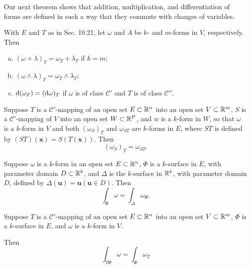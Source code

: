Our next theorem shows that addition, multiplication, and differentiation
of forms are defined in such a way that they commute with changes of variables.

\begin{thm}
    \label{thm:10.22}
    With $E$ and $T$ as in Sec. 10.21, let $\omega$ and $A$ be $k$- and $m$-forms in $V$, respectively. Then
    \begin{enumerate}[(a)]
        \item $(\omega + \lambda)_T = \omega_T + \lambda_T$ if $k = m$;
        \item $(\omega \wedge \lambda)_T = \omega_T \wedge \lambda_T$;
        \item $\d (\omega_T) = (\d \omega)_T$
              if $\omega$ is of class $\mathscr{C}'$
              and $T$ is of class $\mathscr{C}''$.
    \end{enumerate}
\end{thm}


\begin{thm}
    \label{thm:10.23}
    Suppose $T$ is a $\mathscr{C}'$-mapping of an open set $E \subset {\protect\mathbb R}^n$ into an open set $V \subset {\protect\mathbb R}^m$,
    $S$ is a $\mathscr{C}'$-mapping of $V$ into an open set $W \subset {\protect\mathbb R}^P$, and $w$ is a $k$-form in $W$,
    so that $\omega$ is a $k$-form in $V$
    and both $(\omega_S)_T$ and $\omega_{ST}$ are $k$-forms in $E$,
    where $ST$ is defined by $(ST)(\mathbf{x}) = S(T(\mathbf{x}))$.
    Then
    \begin{equation}
        \label{eq:10.71}
        (\omega_S)_T = \omega_{ST} .
    \end{equation}
\end{thm}


\begin{thm}
    \label{thm:10.24}
    Suppose $\omega$ is a $k$-form in an open set $E \subset {\protect\mathbb R}^n$,
    $\Phi$ is a $k$-surface in $E$, with parameter domain $D \subset {\protect\mathbb R}^k$,
    and $\Delta$ is the $k$-surface in ${\protect\mathbb R}^k$, with parameter domain $D$, defined by $\Delta(\mathbf{u}) = \mathbf{u}(\mathbf{u} \in D)$. Then
    \begin{equation*}
        \int_{\Phi} \omega =
        \int_{\Delta} \omega_{\Phi} .
    \end{equation*}
\end{thm}


\begin{thm}
    \label{thm:10.25}
    Suppose $T$ is a $\mathscr{C}'$-mapping of an open set $E \subset {\protect\mathbb R}^n$ into an open set $V \subset {\protect\mathbb R}^m$,
    $\Phi$ is a $k$-surface in $E$,
    and $\omega$ is a $k$-form in $V$.

    Then
    \begin{equation*}
        \int_{T \Phi} \omega =
        \int_{\Phi} \omega_T
    \end{equation*}
\end{thm}

